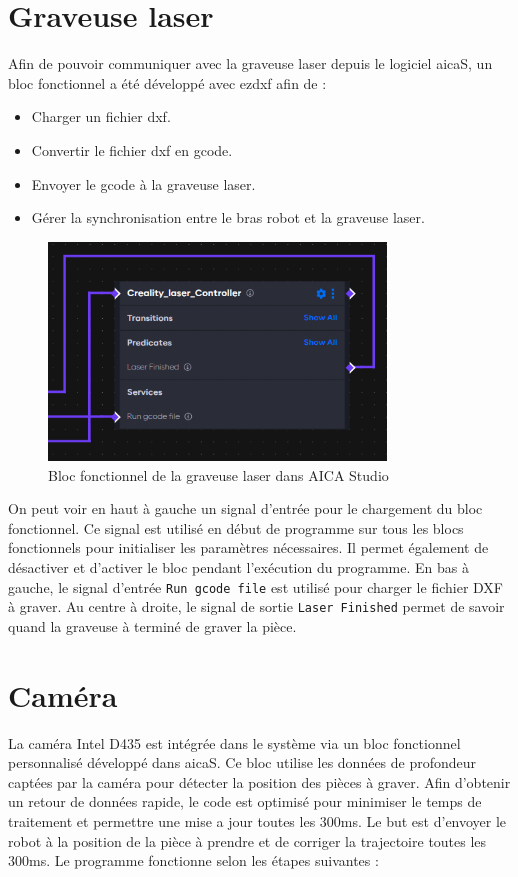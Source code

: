 \section{Graveuse laser}
Afin de pouvoir communiquer avec la graveuse laser depuis le logiciel \gls{aicaS}, un bloc fonctionnel a été développé avec \gls{ezdxf} \cite{DXFDocs} afin de :
\begin{itemize}
    \item Charger un fichier \gls{dxf}.
    \item Convertir le fichier \gls{dxf} en \gls{gcode}.
    \item Envoyer le \gls{gcode} à la graveuse laser.
    \item Gérer la synchronisation entre le bras robot et la graveuse laser.
\end{itemize}

\begin{figure}[H]
    \centering
    \includegraphics[width=0.8\textwidth]{assets/figures/AICA_Laser_interface.png}
    \caption{Bloc fonctionnel de la graveuse laser dans AICA Studio}
    \label{fig:laser_interface}
\end{figure}

On peut voir en haut à gauche un signal d'entrée pour le chargement du bloc fonctionnel. Ce signal est utilisé en début de programme sur tous les blocs fonctionnels pour initialiser les paramètres nécessaires. Il permet également de désactiver et d'activer le bloc pendant l'exécution du programme. En bas à gauche, le signal d'entrée \texttt{Run gcode file} est utilisé pour charger le fichier DXF à graver. Au centre à droite, le signal de sortie \texttt{Laser Finished} permet de savoir quand la graveuse à terminé de graver la pièce.

\section{Caméra}
La caméra Intel D435 est intégrée dans le système via un bloc fonctionnel personnalisé développé dans \gls{aicaS}. Ce bloc utilise les données de profondeur captées par la caméra pour détecter la position des pièces à graver.
Afin d'obtenir un retour de données rapide, le code est optimisé pour minimiser le temps de traitement et permettre une mise a jour toutes les 300ms. Le but est d'envoyer le robot à la position de la pièce à prendre et de corriger la trajectoire toutes les 300ms.
Le programme fonctionne selon les étapes suivantes :

